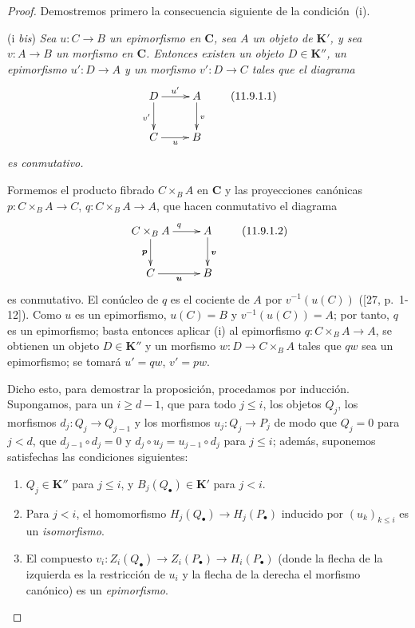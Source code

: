 \begin{proof}
Demostremos primero la consecuencia siguiente de la condición~(i).

\medskip\noindent
(i \emph{bis})
\emph{Sea $u:C\to B$ un epimorfismo en $\boldsymbol{C}$, sea $A$ un
objeto de $\boldsymbol{K}'$, y sea $v:A\to B$ un morfismo en $\boldsymbol{C}$.
Entonces existen un objeto $D\in\boldsymbol{K}''$, un epimorfismo $u':D\to A$ y un
morfismo $v':D\to C$ tales que el diagrama}
\[
\xymatrix{
D\ar[r]^{u'}\ar[d]_{v'} & A\ar[d]^{v}\\
C\ar[r]_{u} & B
}
\tag{11.9.1.1}\label{0.11.9.1.1-fr}
\]
\emph{es conmutativo.}

Formemos el producto fibrado $C\times_B A$ en $\boldsymbol{C}$ y las proyecciones canónicas $p:C\times_B A\to C$, $q:C\times_B A\to A$, que hacen conmutativo el diagrama
\[
\xymatrix{
C\times_B A\ar[r]^{q}\ar[d]_{\boldsymbol{p}} & A\ar[d]^{\boldsymbol{v}}\\
C\ar[r]_{\boldsymbol{u}} & B
}
\tag{11.9.1.2}\label{0.11.9.1.2-fr}
\]
es conmutativo.
El conúcleo de $q$ es el cociente de $A$ por $v^{-1}(u(C))$
([27, p.~1-12]).
Como $u$ es un epimorfismo, $u(C)=B$ y
$v^{-1}(u(C))=A$; por tanto, $q$ es un epimorfismo; basta entonces aplicar (i) al epimorfismo $q:C\times_B A\to A$, se obtienen un objeto
$D\in\boldsymbol{K}''$ y un morfismo $w:D\to C\times_B A$ tales que $qw$ sea un epimorfismo; se tomará $u'=qw$, $v'=pw$.

Dicho esto, para demostrar la proposición, procedamos por inducción. Supongamos, para un $i\geq d-1$, que para todo $j\leq i$, los objetos $Q_j$, los morfismos $d_j:Q_j\to Q_{j-1}$ y los morfismos $u_j:Q_j\to P_j$ de modo que $Q_j=0$ para $j<d$, que $d_{j-1}\circ d_j=0$ y $d_j\circ u_j=u_{j-1}\circ d_j$ para $j\leq i$; además, suponemos satisfechas las condiciones siguientes:
\begin{enumerate}
\item[$(\mathrm I_i)$]
  $Q_j\in\boldsymbol{K}''$ para $j\leq i$, y
  $B_j(Q_\bullet)\in\boldsymbol{K}'$ para $j<i$.

  \item[$(\mathrm{II}_i)$]
  Para $j<i$, el homomorfismo
  $H_j(Q_\bullet)\to H_j(P_\bullet)$
  inducido por $(u_k)_{k\leq i}$ es un \emph{isomorfismo}.

  \item[$(\mathrm{III}_i)$]
  El compuesto
  $v_i:Z_i(Q_\bullet)\to Z_i(P_\bullet)
\to H_i(P_\bullet)$
(donde la flecha de la izquierda es la restricción de $u_i$ y la flecha de la derecha el morfismo canónico) es un \emph{epimorfismo}.
\end{enumerate}


\end{proof}
